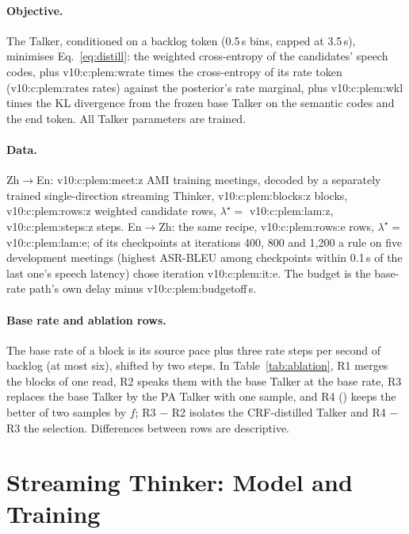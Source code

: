 \paragraph{Objective.} The Talker, conditioned on a backlog token (0.5\,s bins, capped at 3.5\,s), minimises
Eq.~\eqref{eq:distill}: the weighted cross-entropy of the candidates' speech codes, plus \num{v10:c:plem:wrate} times the
cross-entropy of its rate token (\num{v10:c:plem:rates} rates) against the posterior's rate marginal, plus
\num{v10:c:plem:wkl} times the KL divergence from the frozen base Talker on the semantic codes and the end token. All
Talker parameters are trained.

\paragraph{Data.} Zh$\rightarrow$En: \num{v10:c:plem:meet:z} AMI training meetings, decoded by a separately trained
single-direction streaming Thinker, \num{v10:c:plem:blocks:z} blocks, \num{v10:c:plem:rows:z} weighted candidate rows,
$\lambda^\star=$ \num{v10:c:plem:lam:z}, \num{v10:c:plem:steps:z} steps. En$\rightarrow$Zh: the same recipe,
\num{v10:c:plem:rows:e} rows, $\lambda^\star=$ \num{v10:c:plem:lam:e}; of its checkpoints at iterations 400, 800 and
1{,}200 a rule on five development meetings (highest ASR-BLEU among checkpoints within 0.1\,s of the last one's speech
latency) chose iteration \num{v10:c:plem:it:e}. The budget is the base-rate path's own delay minus
\num{v10:c:plem:budgetoff}\,s.

\paragraph{Base rate and ablation rows.} The base rate of a block is its source pace plus three rate steps per second
of backlog (at most six), shifted by two steps. In Table~\ref{tab:ablation}, R1 merges the blocks of one read, R2 speaks
them with the base Talker at the base rate, R3 replaces the base Talker by the PA Talker with one sample, and R4
(\sys{}) keeps the better of two samples by $f$; R3 $-$ R2 isolates the CRF-distilled Talker and R4 $-$ R3 the
selection. Differences between rows are descriptive.

\section{Streaming Thinker: Model and Training}
\label{app:model}
\label{app:train}
\label{app:causal}
\label{app:prompt}

